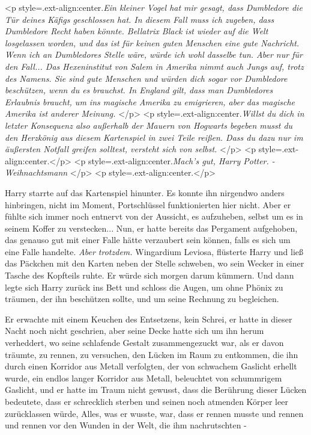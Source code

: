<p style=\grqq{}.ext-align:center\grqq{}.\emph{Ein kleiner Vogel hat mir gesagt,
dass Dumbledore die Tür deines Käfigs geschlossen hat. In diesem Fall muss ich
zugeben, dass Dumbledore Recht haben könnte. Bellatrix Black ist wieder auf die
Welt losgelassen worden, und das ist für keinen guten Menschen eine gute
Nachricht. Wenn ich an Dumbledores Stelle wäre, würde ich wohl dasselbe tun.
Aber nur für den Fall... Das Hexeninstitut von Salem in Amerika nimmt auch Jungs
auf, trotz des Namens. Sie sind gute Menschen und würden dich sogar vor
Dumbledore beschützen, wenn du es brauchst. In England gilt, dass man
Dumbledores Erlaubnis braucht, um ins magische Amerika zu emigrieren, aber das
magische Amerika ist anderer Meinung. }</p> <p
style=\grqq{}.ext-align:center\grqq{}.\emph{Willst du dich in letzter Konsequenz
also außerhalb der Mauern von Hogwarts begeben musst du den Herzkönig aus diesem
Kartenspiel in zwei Teile reißen. Dass du dazu nur im äußersten Notfall greifen
solltest, versteht sich von selbst. }</p> <p
style=\grqq{}.ext-align:center\grqq{}.</p> <p
style=\grqq{}.ext-align:center\grqq{}.\emph{Mach's gut, Harry Potter. -
Weihnachtsmann }</p> <p style=\grqq{}.ext-align:center\grqq{}.</p>

Harry starrte auf das Kartenspiel hinunter. Es konnte ihn nirgendwo anders
hinbringen, nicht im Moment, Portschlüssel funktionierten hier nicht. Aber er
fühlte sich immer noch entnervt von der Aussicht, es aufzuheben, selbst um es in
seinem Koffer zu verstecken... Nun, er hatte bereits das Pergament aufgehoben,
das genauso gut mit einer Falle hätte verzaubert sein können, falls es sich um
eine Falle handelte. \emph{Aber trotzdem. } \glqq Wingardium Leviosa\grqq{},
flüsterte Harry und ließ das Päckchen mit den Karten neben der Stelle schweben,
wo sein Wecker in einer Tasche des Kopfteils ruhte. Er würde sich morgen darum
kümmern. Und dann legte sich Harry zurück ins Bett und schloss die Augen, um
ohne Phönix zu träumen, der ihn beschützen sollte, und um seine Rechnung zu
begleichen.

Er erwachte mit einem Keuchen des Entsetzens, kein Schrei, er hatte in dieser
Nacht noch nicht geschrien, aber seine Decke hatte sich um ihn herum verheddert,
wo seine schlafende Gestalt zusammengezuckt war, als er davon träumte, zu
rennen, zu versuchen, den Lücken im Raum zu entkommen, die ihn durch einen
Korridor aus Metall verfolgten, der von schwachem Gaslicht erhellt wurde, ein
endlos langer Korridor aus Metall, beleuchtet von schummrigem Gaslicht, und er
hatte im Traum nicht gewusst, dass die Berührung dieser Lücken bedeutete, dass
er schrecklich sterben und seinen noch atmenden Körper leer zurücklassen würde,
Alles, was er wusste, war, dass er rennen musste und rennen und rennen vor den
Wunden in der Welt, die ihm nachrutschten -

